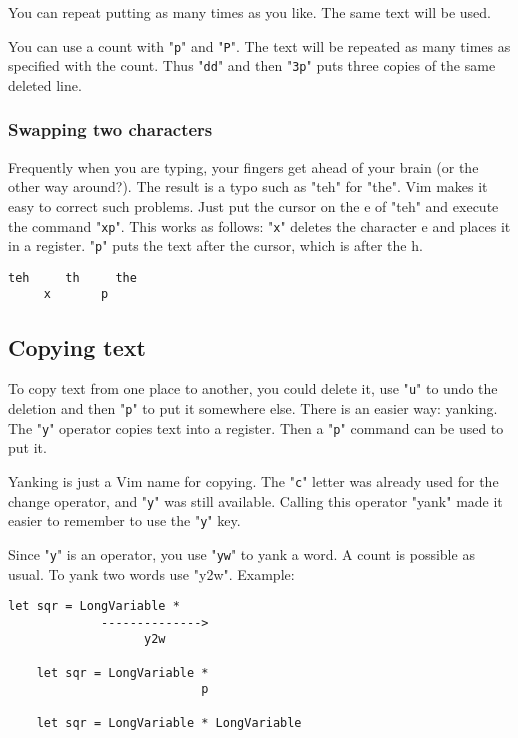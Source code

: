 You can repeat putting as many times as you like.
The same text will be used.

You can use a count with "\texttt{p}" and "\texttt{P}".
The text will be repeated as many times as specified with the count.
Thus "\texttt{dd}" and then "\texttt{3p}" puts three copies of the same deleted line.

\subsubsection{Swapping two characters}

Frequently when you are typing, your fingers get ahead of your brain (or the other way around?).
The result is a typo such as "teh" for "the".
Vim makes it easy to correct such problems.
Just put the cursor on the e of "teh" and execute the command "\texttt{xp}".
This works as follows: "\texttt{x}" deletes the character e and places it in a register.
"\texttt{p}" puts the text after the cursor, which is after the h.

\begin{Verbatim}[samepage=true]
    teh     th     the 
     x       p
\end{Verbatim}

\subsection{Copying text}

To copy text from one place to another, you could delete it, use "\texttt{u}" to undo the deletion and then "\texttt{p}" to put it somewhere else.
There is an easier way: yanking.
The "\texttt{y}" operator copies text into a register.
Then a "\texttt{p}" command can be used to put it.

Yanking is just a Vim name for copying.
The "\texttt{c}" letter was already used for the change operator, and "\texttt{y}" was still available.
Calling this operator "yank" made it easier to remember to use the "\texttt{y}" key.

Since "\texttt{y}" is an operator, you use "\texttt{yw}" to yank a word.
A count is possible as usual.
To yank two words use "y2w".
Example:

\begin{Verbatim}[samepage=true]
    let sqr = LongVariable * 
             -------------->
                   y2w

    let sqr = LongVariable * 
                           p

    let sqr = LongVariable * LongVariable 
\end{Verbatim}

